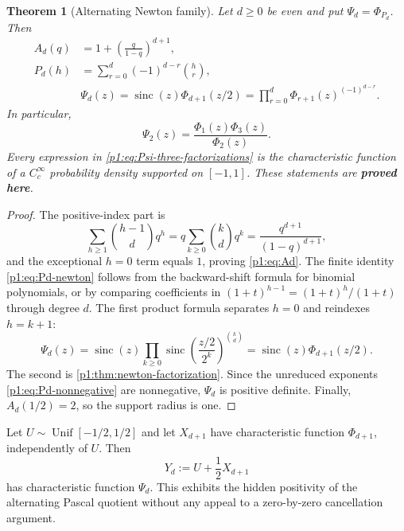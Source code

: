 \documentclass[11pt,oneside]{article}
\numberwithin{equation}{section}
\newtheorem{theorem}{Theorem}[section]
\theoremstyle{definition}
\theoremstyle{remark}
\newcommand{\sinc}{\operatorname{sinc}}
\newcommand{\statusproved}{\textcolor{deepgreen}{\textbf{proved here}}}
\begin{document}
\begin{theorem}[Alternating Newton family]
\label{p1:thm:alternating-family}
Let $d\ge0$ be even and put $\Psi_d=\Phi_{P_d}$.  Then
\begin{align}
 A_d(q)
 &=1+\left(\frac q{1-q}\right)^{d+1},
 \label{p1:eq:Ad}\\
 P_d(h)
 &=\sum_{r=0}^{d}(-1)^{d-r}\binom hr,
 \label{p1:eq:Pd-newton}\\
 &\boxed{\Psi_d(z)
 =\sinc(z)\Phi_{d+1}(z/2)
 =\prod_{r=0}^{d}\Phi_{r+1}(z)^{(-1)^{d-r}}.}
 \label{p1:eq:Psi-three-factorizations}
\end{align}
In particular,
\begin{equation}
 \boxed{\Psi_2(z)=\frac{\Phi_1(z)\Phi_3(z)}{\Phi_2(z)}.}
 \label{p1:eq:Psi2-quotient}
\end{equation}
Every expression in \eqref{p1:eq:Psi-three-factorizations} is the characteristic function of
a $C_c^\infty$ probability density supported on $[-1,1]$.  These statements are
\statusproved.
\end{theorem}

\begin{proof}
The positive-index part is
\[
 \sum_{h\ge1}\binom{h-1}{d}q^h
 =q\sum_{k\ge0}\binom kdq^k
 =\frac{q^{d+1}}{(1-q)^{d+1}},
\]
and the exceptional $h=0$ term equals $1$, proving \eqref{p1:eq:Ad}.  The finite identity
\eqref{p1:eq:Pd-newton} follows from the backward-shift formula for binomial polynomials, or by
comparing coefficients in
$(1+t)^{h-1}=(1+t)^h/(1+t)$ through degree $d$.
The first product formula separates $h=0$ and reindexes $h=k+1$:
\[
 \Psi_d(z)=\sinc(z)
 \prod_{k\ge0}\sinc\!\left(\frac{z/2}{2^k}\right)^{\binom kd}
 =\sinc(z)\Phi_{d+1}(z/2).
\]
The second is \cref{p1:thm:newton-factorization}.  Since the unreduced exponents
\eqref{p1:eq:Pd-nonnegative} are nonnegative, $\Psi_d$ is positive definite.  Finally,
$A_d(1/2)=2$, so the support radius is one.
\end{proof}

\begin{corollary}
\label{p1:cor:Psi-random-model}
Let $U\sim\operatorname{Unif}[-1/2,1/2]$ and let $X_{d+1}$ have characteristic function
$\Phi_{d+1}$, independently of $U$.  Then
\begin{equation}
 Y_d:=U+\frac12X_{d+1}
 \label{p1:eq:Yd-random}
\end{equation}
has characteristic function $\Psi_d$.  This exhibits the hidden positivity of the
alternating Pascal quotient without any appeal to a zero-by-zero cancellation argument.
\end{corollary}
\end{document}
